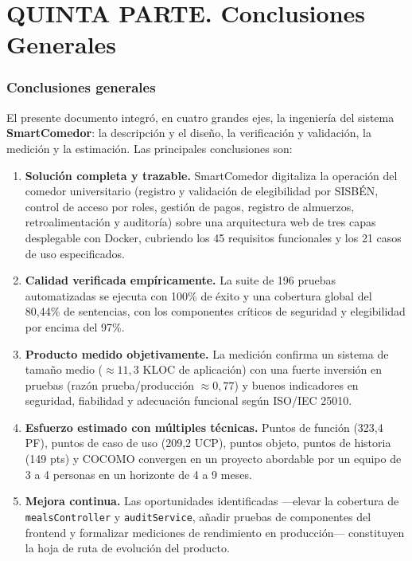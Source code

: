 \documentclass[stu,11pt,floatsintext]{apa7}
\begin{document}




\part*{QUINTA PARTE. Conclusiones Generales}
\section{Conclusiones generales}
El presente documento integró, en cuatro grandes ejes, la ingeniería del sistema
\textbf{SmartComedor}: la descripción y el diseño, la verificación y validación, la
medición y la estimación. Las principales conclusiones son:

\begin{enumerate}[leftmargin=1.5em]
\item \textbf{Solución completa y trazable.} SmartComedor digitaliza la operación del
comedor universitario (registro y validación de elegibilidad por SISBÉN, control de
acceso por roles, gestión de pagos, registro de almuerzos, retroalimentación y
auditoría) sobre una arquitectura web de tres capas desplegable con Docker, cubriendo
los 45 requisitos funcionales y los 21 casos de uso especificados.
\item \textbf{Calidad verificada empíricamente.} La suite de 196 pruebas automatizadas
se ejecuta con 100\% de éxito y una cobertura global del 80,44\% de sentencias, con los
componentes críticos de seguridad y elegibilidad por encima del 97\%.
\item \textbf{Producto medido objetivamente.} La medición confirma un sistema de tamaño
medio ($\approx 11{,}3$ KLOC de aplicación) con una fuerte inversión en pruebas (razón
prueba/producción $\approx 0{,}77$) y buenos indicadores en seguridad, fiabilidad y
adecuación funcional según ISO/IEC 25010.
\item \textbf{Esfuerzo estimado con múltiples técnicas.} Puntos de función (323,4 PF),
puntos de caso de uso (209,2 UCP), puntos objeto, puntos de historia (149 pts) y COCOMO
convergen en un proyecto abordable por un equipo de 3 a 4 personas en un horizonte de
4 a 9 meses.
\item \textbf{Mejora continua.} Las oportunidades identificadas —elevar la cobertura de
\texttt{mealsController} y \texttt{auditService}, añadir pruebas de componentes del
frontend y formalizar mediciones de rendimiento en producción— constituyen la hoja de
ruta de evolución del producto.
\end{enumerate}
\end{document}
